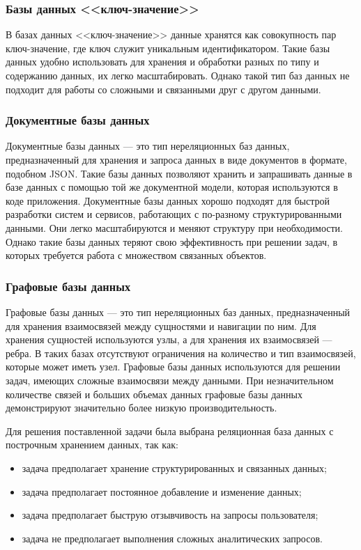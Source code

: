 \subsubsection{Базы данных <<ключ-значение>>}

В базах данных <<ключ-значение>> данные хранятся как совокупность пар ключ-значение, где ключ служит уникальным идентификатором. Такие базы данных удобно использовать для хранения и обработки разных по типу и содержанию данных, их легко масштабировать. Однако такой тип баз данных не подходит для работы со сложными и связанными друг с другом данными.

\subsubsection{Документные базы данных}

Документные базы данных --- это тип нереляционных баз данных, предназначенный для хранения и запроса данных в виде документов в формате, подобном JSON. Такие базы данных позволяют хранить и запрашивать данные в базе данных с помощью той же документной модели, которая используются в коде приложения. Документные базы данных хорошо подходят для быстрой разработки систем и сервисов, работающих с по-разному структурированными данными. Они легко масштабируются и меняют структуру при необходимости. Однако такие базы данных теряют свою эффективность при решении задач, в которых требуется работа с множеством связанных объектов.

\subsubsection{Графовые базы данных}

Графовые базы данных --- это тип нереляционных баз данных, предназначенный для хранения взаимосвязей между сущностями и навигации по ним. Для хранения сущностей используются узлы, а для хранения их взаимосвязей --- ребра. В таких базах отсутствуют ограничения на количество и тип взаимосвязей, которые может иметь узел. Графовые базы данных используются для решении задач, имеющих сложные взаимосвязи между данными. При незначительном количестве связей и больших объемах данных графовые базы данных демонстрируют значительно более низкую производительность.

Для решения поставленной задачи была выбрана реляционная база данных с построчным хранением данных, так как:

\begin{itemize}
    \item задача предполагает хранение структурированных и связанных данных;
    \item задача предполагает постоянное добавление и изменение данных;
    \item задача предполагает быструю отзывчивость на запросы пользователя;
    \item задача не предполагает выполнения сложных аналитических запросов.
\end{itemize}

